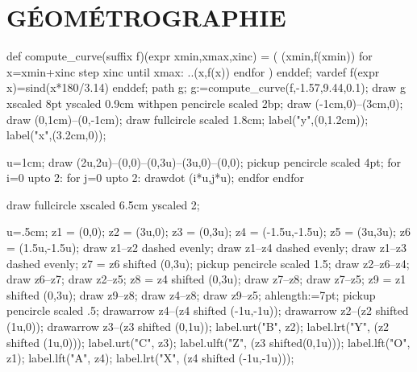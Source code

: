 \documentclass[12pt,a4paper,twocolumn]{book} %
\begin{document}
\section{GÉOMÉTROGRAPHIE}
\begin{mpdisplay}
  def compute_curve(suffix f)(expr xmin,xmax,xinc) = ( (xmin,f(xmin))
  for x=xmin+xinc step xinc until xmax: ..(x,f(x)) endfor )
  enddef;
  vardef f(expr x)=sind(x*180/3.14) enddef;
  path g;
  g:=compute_curve(f,-1.57,9.44,0.1);
  draw g xscaled 8pt yscaled 0.9cm withpen pencircle scaled 2bp;
  draw (-1cm,0)--(3cm,0);
  draw (0,1cm)--(0,-1cm);
  draw fullcircle scaled 1.8cm;
  label("y",(0,1.2cm));
  label("x",(3.2cm,0));
\end{mpdisplay}
\begin{mpdisplay}
  u=1cm;
  draw (2u,2u)--(0,0)--(0,3u)--(3u,0)--(0,0);
  pickup pencircle scaled 4pt;
  for i=0 upto 2:
  for j=0 upto 2: drawdot (i*u,j*u); endfor
  endfor
\end{mpdisplay}




\begin{mpdisplay}
  draw fullcircle xscaled 6.5cm yscaled 2\mpdim\baselineskip;
\end{mpdisplay}

\begin{mpdisplay}
  u=.5cm;
  z1 = (0,0);
  z2 = (3u,0);
  z3 = (0,3u);
  z4 = (-1.5u,-1.5u);
  z5 = (3u,3u);
  z6 = (1.5u,-1.5u);
  draw z1--z2 dashed evenly;
  draw z1--z4 dashed evenly;
  draw z1--z3 dashed evenly;
  z7 = z6 shifted (0,3u);
  pickup pencircle scaled 1.5;
  draw z2--z6--z4;
  draw z6--z7;
  draw z2--z5;
  z8 = z4 shifted (0,3u);
  draw z7--z8;
  draw z7--z5;
  z9 = z1 shifted (0,3u);
  draw z9--z8;
  draw z4--z8;
  draw z9--z5;
  ahlength:=7pt;
  pickup pencircle scaled .5;
  drawarrow z4--(z4 shifted (-1u,-1u));
  drawarrow z2--(z2 shifted (1u,0));
  drawarrow z3--(z3 shifted (0,1u));
  label.urt("B", z2);
  label.lrt("Y", (z2 shifted (1u,0)));
  label.urt("C", z3);
  label.ulft("Z", (z3 shifted(0,1u)));
  label.lft("O", z1);
  label.lft("A", z4);
  label.lrt("X", (z4 shifted (-1u,-1u)));
\end{mpdisplay}
\end{document}

